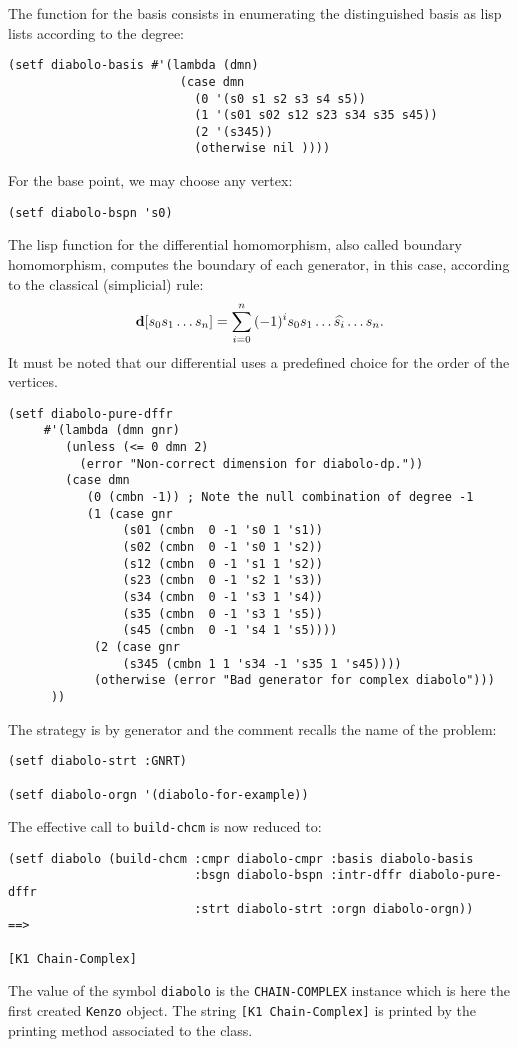 The function for the basis consists  in enumerating the distinguished basis as lisp lists
according to the degree:
{\footnotesize\begin{verbatim}
(setf diabolo-basis #'(lambda (dmn)                         
                        (case dmn                           
                          (0 '(s0 s1 s2 s3 s4 s5))          
                          (1 '(s01 s02 s12 s23 s34 s35 s45))
                          (2 '(s345))
                          (otherwise nil ))))
\end{verbatim}}
For the base point, we may choose any vertex:
{\footnotesize\begin{verbatim}
(setf diabolo-bspn 's0)
\end{verbatim}}
The lisp function for the differential homomorphism, also called boundary homomorphism,
computes the boundary of each generator, in this case,  according to the classical (simplicial) rule:
$$ {\bf d}[{s_0s_1\ldots s_n}] = \sum_{i=0}^n{(-1)^is_0s_1\ldots\widehat{s_i}\ldots s_n}.$$
It must be noted that our differential uses a predefined choice for the order of the vertices.
{\footnotesize\begin{verbatim}
(setf diabolo-pure-dffr 
     #'(lambda (dmn gnr)                    
        (unless (<= 0 dmn 2)
          (error "Non-correct dimension for diabolo-dp."))
        (case dmn
           (0 (cmbn -1)) ; Note the null combination of degree -1
           (1 (case gnr
                (s01 (cmbn  0 -1 's0 1 's1))    
                (s02 (cmbn  0 -1 's0 1 's2))    
                (s12 (cmbn  0 -1 's1 1 's2))    
                (s23 (cmbn  0 -1 's2 1 's3))
                (s34 (cmbn  0 -1 's3 1 's4))
                (s35 (cmbn  0 -1 's3 1 's5))
                (s45 (cmbn  0 -1 's4 1 's5))))
            (2 (case gnr
                (s345 (cmbn 1 1 's34 -1 's35 1 's45))))
            (otherwise (error "Bad generator for complex diabolo")))
      ))
\end{verbatim}}
The  strategy is by generator and the comment recalls the name of the problem:
{\footnotesize\begin{verbatim}
(setf diabolo-strt :GNRT)        

(setf diabolo-orgn '(diabolo-for-example))  
\end{verbatim}}
The effective call to {\tt build-chcm} is now reduced to: 
{\footnotesize\begin{verbatim}
(setf diabolo (build-chcm :cmpr diabolo-cmpr :basis diabolo-basis
                          :bsgn diabolo-bspn :intr-dffr diabolo-pure-dffr
                          :strt diabolo-strt :orgn diabolo-orgn))       ==>

[K1 Chain-Complex]
\end{verbatim}}
The value of the symbol {\tt diabolo} is the {\tt CHAIN-COMPLEX}  instance which is here the first
created {\tt Kenzo} object. The string {\tt [K1 Chain-Complex]}
is printed by the printing method associated to the class. 

